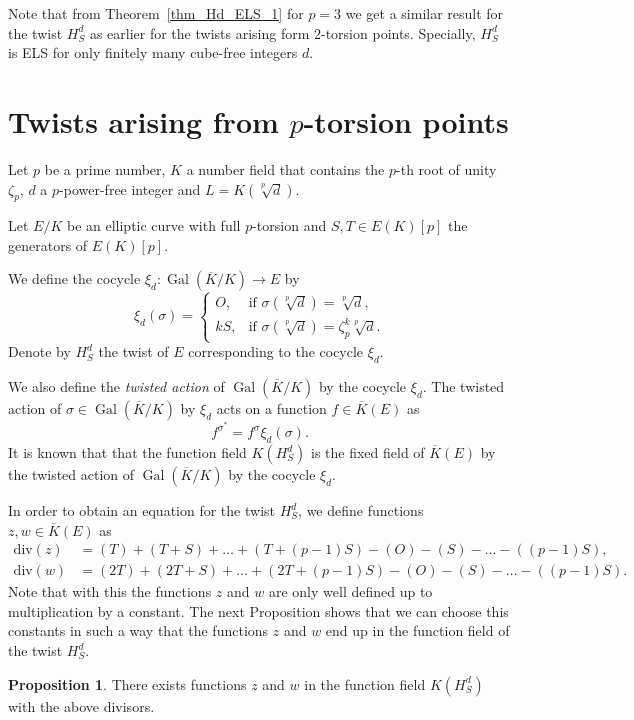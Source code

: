 \documentclass[a4paper, 12pt]{amsart}
\theoremstyle{definition}
\newtheorem{proposition}[theorem]{Proposition}
\theoremstyle{remark}
\newcommand{\GalK}{\operatorname{Gal}(\overline{K}/K)}
\renewcommand{\div}{\mathrm{div}}
\numberwithin{equation}{section}
\begin{document}
Note that from Theorem~\ref{thm_Hd_ELS_1} for $p=3$ we get a similar result for the twist $H_S^d$ as earlier for the twists arising form $2$-torsion points. Specially, $H_S^d$ is ELS for only finitely many cube-free integers $d$.


\section{Twists arising from \texorpdfstring{$p$}{p}-torsion points}\label{sec:3}

Let $p$ be a prime number, $K$ a number field that contains the $p$-th root of unity $\zeta_p$, $d$ a $p$-power-free integer and $L=K(\sqrt[p]{d})$. 

Let $E/K$ be an elliptic curve with full $p$-torsion  and $S,T \in E(K)[p]$ the generators of $E(K)[p]$. 

We define the cocycle $\xi_d : \GalK \to E$ by
\[
    \xi_d (\sigma)=
    \begin{cases}
        O, & \text{if } \sigma(\sqrt[p]{d})=\sqrt[p]{d}, \\
        kS, & \text{if } \sigma(\sqrt[p]{d})=\zeta_p^k\sqrt[p]{d}.
    \end{cases}
\]
Denote by $H_S^d$ the twist of $E$ corresponding to the cocycle $\xi_d$. 

We also define the \textit{twisted action} of $\GalK$ by the cocycle $\xi_d$. The twisted action of $\sigma \in \GalK$ by $\xi_d$ acts on a function $f \in \overline{K}(E)$ as 
\[
    f^{\sigma^{*}}=f^\sigma \xi_d(\sigma).
\]
It is known that that the function field $K(H_S^d)$ is the fixed field of $\overline{K}(E)$ by the twisted action of $\GalK$ by the cocycle $\xi_d$.

In order to obtain an equation for the twist $H_S^d$, we define functions $z,w \in \overline{K}(E)$ as
\begin{align*}
    \div{(z)} &= (T)+(T+S)+\dotso+(T+(p-1)S)-(O)-(S)-\dotso -((p-1)S),\\
    \div{(w)} &= (2T)+(2T+S)+\dotso+(2T+(p-1)S)-(O)-(S)-\dotso -((p-1)S).
\end{align*}
Note that with this the functions $z$ and $w$ are only well defined up to multiplication by a constant. The next Proposition shows that we can choose this constants in such a way that the functions $z$ and $w$ end up in the function field of the twist $H_S^d$.

\begin{proposition}\label{prop_zw_def}
    There exists functions $z$ and $w$ in the function field $K(H_S^d)$ with the above divisors.
\end{proposition}
\end{document}
